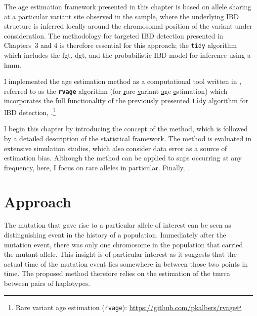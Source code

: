 The age estimation framework presented in this chapter is based on allele sharing at a particular variant site observed in the sample, where the underlying IBD structure is inferred locally around the chromosomal position of the variant under consideration.
The methodology for targeted IBD detection presented in Chapters~3 and 4 is therefore essential for this approach; \ie the \texttt{tidy} algorithm which includes the \gls{fgt}, \gls{dgt}, and the probabilistic IBD model for inference using a \gls{hmm}.

I implemented the age estimation method as a computational tool written in \cpp, referred to as the \textbf{\texttt{rvage}} algorithm (for \underline{r}are \underline{v}ariant \underline{a}\underline{g}e \underline{e}stimation) which incorporates the full functionality of the previously presented \texttt{tidy} algorithm for IBD detection, .\footnote{Rare variant age estimation (\texttt{rvage}): \url{https://github.com/pkalbers/rvage}}

I begin this chapter by introducing the concept of the method, which is followed by a detailed description of the statistical framework.
The method is evaluated in extensive simulation studies, which also consider data error as a source of estimation bias.
Although the method can be applied to \glspl{snp} occurring at any frequency, here, I focus on rare alleles in particular.
Finally, .



%
\section{Approach}
%

The mutation that gave rise to a particular allele of interest can be seen as distinguishing event in the history of a population.
Immediately after the mutation event, there was only one chromosome in the population that carried the mutant allele.
This insight is of particular interest as it suggests that the actual time of the mutation event lies somewhere in between those two points in time.
The proposed method therefore relies on the estimation of the \gls{tmrca} between pairs of haplotypes.

